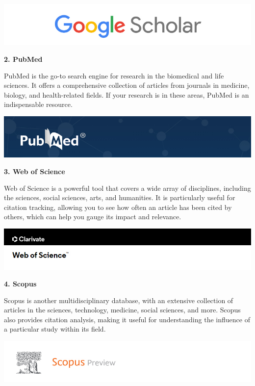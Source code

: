 \documentclass[
]{book}
\begin{document}
\href{https://scholar.google.com/}{\includegraphics[width=1\textwidth,height=\textheight]{images/google-scholar.jpg}}

\textbf{2. PubMed}

PubMed is the go-to search engine for research in the biomedical and life sciences. It offers a comprehensive collection of articles from journals in medicine, biology, and health-related fields. If your research is in these areas, PubMed is an indispensable resource.

\href{https://pubmed.ncbi.nlm.nih.gov/}{\includegraphics[width=1\textwidth,height=\textheight]{images/pubmed.jpg}}

\textbf{3. Web of Science}

Web of Science is a powerful tool that covers a wide array of disciplines, including the sciences, social sciences, arts, and humanities. It is particularly useful for citation tracking, allowing you to see how often an article has been cited by others, which can help you gauge its impact and relevance.

\href{https://go.openathens.net/redirector/siue.edu?url=https\%3A\%2F\%2Fwebofknowledge.com\%2FWOS}{\includegraphics[width=1\textwidth,height=\textheight]{images/web-of-science.jpg}}

\textbf{4. Scopus}

Scopus is another multidisciplinary database, with an extensive collection of articles in the sciences, technology, medicine, social sciences, and more. Scopus also provides citation analysis, making it useful for understanding the influence of a particular study within its field.

\href{https://www.scopus.com/home.uri}{\includegraphics[width=1\textwidth,height=\textheight]{images/scopus.jpg}}
\end{document}
